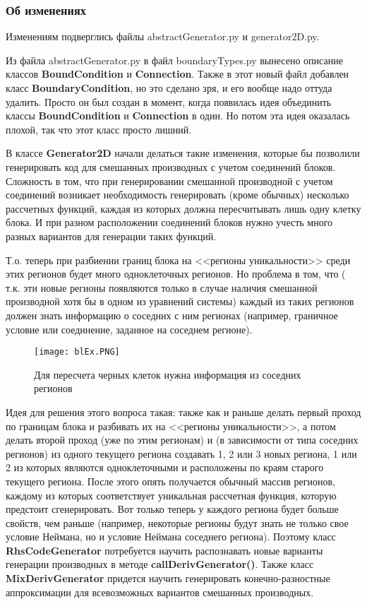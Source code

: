 \documentclass[a4paper]{article}
\begin{document}
\subsubsection{\large Об изменениях}

Изменениям подверглись файлы abstractGenerator.py и generator2D.py.

Из файла abstractGenerator.py в файл boundaryTypes.py вынесено описание классов {\bf BoundCondition} и {\bf Connection}. Также в этот новый файл добавлен класс {\bf BoundaryCondition}, но это сделано зря, и его вообще надо оттуда удалить. Просто он был создан в момент, когда появилась идея объединить классы {\bf BoundCondition} и {\bf Connection} в один. Но потом эта идея оказалась плохой, так что этот класс просто лишний.

В классе {\bf Generator2D} начали делаться такие изменения, которые бы позволили генерировать код для смешанных производных с учетом соединений блоков. Сложность в том, что при генерировании смешанной производной с учетом соединений возникает необходимость генерировать (кроме обычных) несколько рассчетных функций, каждая из которых должна пересчитывать лишь одну клетку блока. И при разном расположении соединений блоков нужно учесть много разных вариантов для генерации таких функций.

Т.о. теперь при разбиении границ блока на <<регионы уникальности>> среди этих регионов будет много одноклеточных регионов. Но проблема в том, что ( т.к. эти новые регионы появляются только в случае наличия смешанной производной хотя бы в одном из уравнений системы) каждый из таких регионов должен знать информацию о соседних с ним регионах (например, граничное условие или соединение, заданное на соседнем регионе).

\begin{figure}[h!]
\centering
\texttt{[image: blEx.PNG]}
\caption{Для пересчета черных клеток нужна информация из соседних регионов}\label{pict2}
\end{figure}

Идея для решения этого вопроса такая: также как и раньше делать первый проход по границам блока и разбивать их на <<регионы уникальности>>, а потом делать второй проход (уже по этим регионам) и (в зависимости от типа соседних регионов) из одного текущего региона создавать 1, 2 или 3 новых региона, 1 или 2 из которых являются одноклеточными и расположены по краям старого текущего региона. После этого опять получается обычный массив регионов, каждому из которых соответствует уникальная рассчетная функция, которую предстоит сгенерировать. Вот только теперь у каждого региона будет больше свойств, чем раньше (например, некоторые регионы будут знать не только свое условие Неймана, но и условие Неймана соседнего региона). Поэтому класс {\bf RhsCodeGenerator} потребуется научить распознавать новые варианты генерации производных в методе {\bf callDerivGenerator()}. Также класс {\bf MixDerivGenerator} придется научить генерировать конечно-разностные аппроксимации для всевозможных вариантов смешанных производных.
\end{document}
